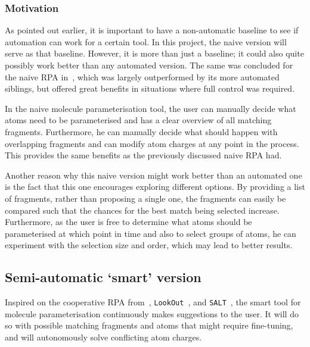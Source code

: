 \subsubsection{Motivation}
As pointed out earlier, it is important to have a non-automatic baseline to see if automation can work for a certain tool. In this project, the naive version will serve as that baseline. However, it is more than just a baseline; it could also quite possibly work better than any automated version. The same was concluded for the naive RPA in~\cite{payne2000varying}, which was largely outperformed by its more automated siblings, but offered great benefits in situations where full control was required.

In the naive molecule parameterisation tool, the user can manually decide what atoms need to be parameterised and has a clear overview of all matching fragments. Furthermore, he can manually decide what should happen with overlapping fragments and can modify atom charges at any point in the process. This provides the same benefits as the previously discussed naive RPA had.

Another reason why this naive version might work better than an automated one is the fact that this one encourages exploring different options. By providing a list of fragments, rather than proposing a single one, the fragments can easily be compared such that the chances for the best match being selected increase. Furthermore, as the user is free to determine what atoms should be parameterised at which point in time and also to select groups of atoms, he can experiment with the selection size and order, which may lead to better results.


\subsection{Semi-automatic `smart' version}
Inspired on the cooperative RPA from~\cite{payne2000varying}, \verb|LookOut|~\cite{horvitz1999principles}, and \verb|SALT|~\cite{marcus1987taking}, the smart tool for molecule parameterisation continuously makes suggestions to the user. It will do so with possible matching fragments and atoms that might require fine-tuning, and will autonomously solve conflicting atom charges.

